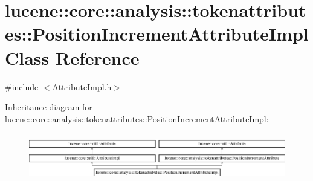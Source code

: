 \hypertarget{classlucene_1_1core_1_1analysis_1_1tokenattributes_1_1PositionIncrementAttributeImpl}{}\section{lucene\+:\+:core\+:\+:analysis\+:\+:tokenattributes\+:\+:Position\+Increment\+Attribute\+Impl Class Reference}
\label{classlucene_1_1core_1_1analysis_1_1tokenattributes_1_1PositionIncrementAttributeImpl}


{\ttfamily \#include $<$Attribute\+Impl.\+h$>$}

Inheritance diagram for lucene\+:\+:core\+:\+:analysis\+:\+:tokenattributes\+:\+:Position\+Increment\+Attribute\+Impl\+:\begin{figure}[H]
\begin{center}
\leavevmode
\includegraphics[height=2.084367cm]{classlucene_1_1core_1_1analysis_1_1tokenattributes_1_1PositionIncrementAttributeImpl}
\end{center}
\end{figure}
